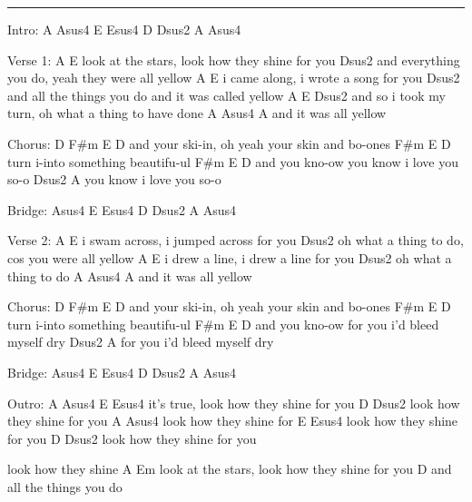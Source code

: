 \noindent\rule{\columnwidth}{1pt}

\begin{multicols}{2}
\begin{lstsong}
Intro: A   Asus4   E   Esus4   D   Dsus2   A   Asus4

Verse 1:
A                                         E
look at the stars, look how they shine for you
                    Dsus2
and everything you do, yeah they were all yellow
A                               E
i came along, i wrote a song for you
                        Dsus2
and all the things you do and it was called yellow
A               E                                Dsus2
and so i took my turn, oh what a thing to have done
                     A   Asus4   A
and it was all yellow

Chorus:
D             F#m              E           D
and your ski-in, oh yeah your skin and bo-ones
       F#m            E        D
turn i-into something beautifu-ul
            F#m           E           D                       
and you kno-ow you know i love you so-o
Dsus2                  A
you know i love you so-o

Bridge: Asus4   E   Esus4   D   Dsus2   A   Asus4

Verse 2:
A                                 E
i swam across, i jumped across for you
                    Dsus2
oh what a thing to do, cos you were all yellow
A                               E
i drew a line, i drew a line for you
                    Dsus2
oh what a thing to do
                     A   Asus4   A
and it was all yellow

Chorus:
D             F#m              E           D
and your ski-in, oh yeah your skin and bo-ones
       F#m            E        D
turn i-into something beautifu-ul
            F#m            E            D                       
and you kno-ow for you i'd bleed myself dry
Dsus2                    A
for you i'd bleed myself dry

Bridge: Asus4   E   Esus4   D   Dsus2   A   Asus4

Outro:
     A   Asus4                     E   Esus4
it's true, look how they shine for you
                        D   Dsus2
look how they shine for you
                       A   Asus4
look how they shine for
                        E   Esus4
look how they shine for you
                        D   Dsus2
look how they shine for you

look how they shine
A                                         Em
 look at the stars, look how they shine for you
                       D
and all the things you do
\end{lstsong}
\end{multicols}
\newpage

